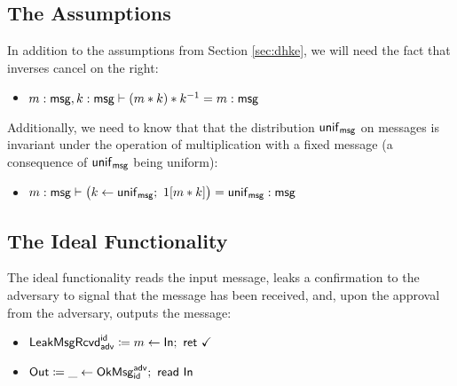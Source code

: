 \subsection{The Assumptions}
In addition to the assumptions from Section \ref{sec:dhke}, we will need the fact that inverses cancel on the right:
\begin{itemize}
\item $m : \mathsf{msg}, k : \mathsf{msg} \vdash (m * k) * k^{-1} = m : \mathsf{msg}$
\end{itemize}
Additionally, we need to know that that the distribution $\mathsf{unif}_{\mathsf{msg}}$ on messages is invariant under the operation of multiplication with a fixed message (a consequence of $\mathsf{unif}_{\mathsf{msg}}$ being uniform):
\begin{itemize}
\item $m : \mathsf{msg} \vdash \big(k \leftarrow \mathsf{unif}_{\mathsf{msg}}; \ 1[ m * k]\big) = \mathsf{unif}_{\mathsf{msg}} : \mathsf{msg}$
\end{itemize}

\subsection{The Ideal Functionality}
The ideal functionality reads the input message, leaks a confirmation to the adversary to signal that the message has been received, and, upon the approval from the adversary, outputs the message:
\begin{itemize}
\item $\mathsf{LeakMsgRcvd}^{\mathsf{id}}_{\mathsf{adv}} \coloneqq m \leftarrow \mathsf{In}; \ \mathsf{ret} \ \checkmark$
\item $\mathsf{Out} \coloneqq \_ \leftarrow \mathsf{OkMsg}^{\mathsf{adv}}_{\mathsf{id}}; \ \mathsf{read} \ \mathsf{In}$
\end{itemize}

